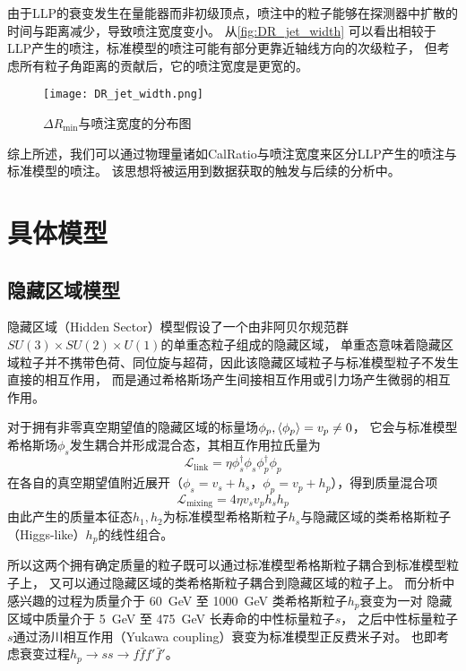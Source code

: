 由于LLP的衰变发生在量能器而非初级顶点，喷注中的粒子能够在探测器中扩散的时间与距离减少，导致喷注宽度变小。
从\autoref{fig:DR_jet_width} 可以看出相较于LLP产生的喷注，标准模型的喷注可能有部分更靠近轴线方向的次级粒子，
但考虑所有粒子角距离的贡献后，它的喷注宽度是更宽的。

\begin{figure}[ht]
    \centering
    \texttt{[image: DR\_jet\_width.png]}
    \caption{$\Delta R_{\min}$与喷注宽度的分布图}
    \label{fig:DR_jet_width}
\end{figure}

综上所述，我们可以通过物理量诸如CalRatio与喷注宽度来区分LLP产生的喷注与标准模型的喷注。
该思想将被运用到数据获取的触发与后续的分析中。


\section{具体模型}

\subsection{隐藏区域模型}
隐藏区域（Hidden Sector）模型假设了一个由非阿贝尔规范群$SU(3)\times SU(2) \times U(1)$的单重态粒子组成的隐藏区域，
单重态意味着隐藏区域粒子并不携带色荷、同位旋与超荷，因此该隐藏区域粒子与标准模型粒子不发生直接的相互作用，
而是通过希格斯场产生间接相互作用或引力场产生微弱的相互作用。
\cite{hidden_sector}

对于拥有非零真空期望值的隐藏区域的标量场$\phi_p, \ev{\phi_p}=v_p \neq 0$，
它会与标准模型希格斯场$\phi_s$发生耦合并形成混合态，其相互作用拉氏量为
\begin{equation}
    \mathcal{L}_\text{link} = \eta \phi^\dagger_s \phi_s \phi^\dagger_p \phi_p
\end{equation}
在各自的真空期望值附近展开（$\phi_s = v_s + h_s$，$\phi_p = v_p + h_p$），得到质量混合项
\begin{equation}
    \mathcal{L}_\text{mixing} = 4 \eta v_s v_p h_s h_p
\end{equation}
由此产生的质量本征态$h_1, h_2$为标准模型希格斯粒子$h_s$与隐藏区域的类希格斯粒子（Higgs-like）$h_p$的线性组合。

所以这两个拥有确定质量的粒子既可以通过标准模型希格斯粒子耦合到标准模型粒子上，
又可以通过隐藏区域的类希格斯粒子耦合到隐藏区域的粒子上。
而分析中感兴趣的过程为质量介于 \SI{60}{GeV} 至 \SI{1000}{GeV} 类希格斯粒子$h_p$衰变为一对
隐藏区域中质量介于 \SI{5}{GeV} 至 \SI{475}{GeV} 长寿命的中性标量粒子$s$，
之后中性标量粒子$s$通过汤川相互作用（Yukawa coupling）衰变为标准模型正反费米子对。
也即考虑衰变过程$h_p \rightarrow ss \rightarrow f \bar{f} f' \bar{f}'$。

